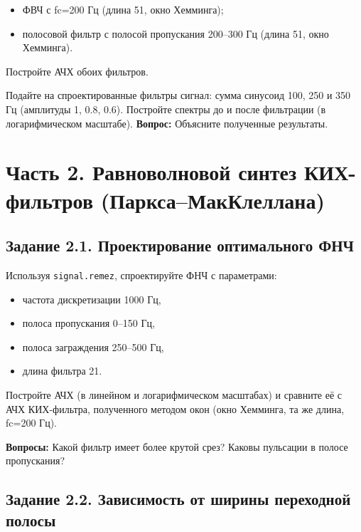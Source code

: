 \documentclass[12pt,a4paper,openany]{book}
\providecommand{\tightlist}{\setlength{\itemsep}{0pt}\setlength{\parskip}{0pt}}
\begin{document}
\begin{itemize}
\tightlist
\item
  ФВЧ с fc=200 Гц (длина 51, окно Хемминга);
\item
  полосовой фильтр с полосой пропускания 200--300 Гц (длина 51, окно Хемминга).
\end{itemize}

Постройте АЧХ обоих фильтров.

Подайте на спроектированные фильтры сигнал: сумма синусоид 100, 250 и 350 Гц (амплитуды 1, 0.8, 0.6). Постройте спектры до и после фильтрации (в логарифмическом масштабе).
\textbf{Вопрос:} Объясните полученные результаты.

\section*{Часть 2. Равноволновой синтез КИХ-фильтров (Паркса--МакКлеллана)}

\subsection*{Задание 2.1. Проектирование оптимального ФНЧ}

Используя \texttt{signal.\allowbreak{}remez}, спроектируйте ФНЧ с параметрами:

\begin{itemize}
\tightlist
\item
  частота дискретизации 1000 Гц,
\item
  полоса пропускания 0--150 Гц,
\item
  полоса заграждения 250--500 Гц,
\item
  длина фильтра 21.
\end{itemize}

Постройте АЧХ (в линейном и логарифмическом масштабах) и сравните её с АЧХ КИХ-фильтра, полученного методом окон (окно Хемминга, та же длина, fc=200 Гц).

\textbf{Вопросы:} Какой фильтр имеет более крутой срез? Каковы пульсации в полосе пропускания?

\subsection*{Задание 2.2. Зависимость от ширины переходной полосы}
\end{document}
